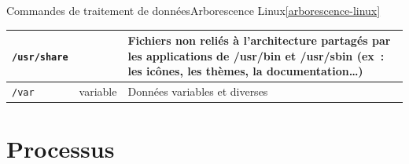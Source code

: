 \documentclass{beamer}
\begin{document}
\begin{frame}{Commandes de traitement de données}{Arborescence Linux\cref{arborescence-linux}}
\begin{tiny}
\begin{table}[h!]
\begin{tabular}{|l|p{3cm}|p{6cm}|}
                    \hline
                    \lstinline{/usr/share} &                         & Fichiers non reliés à l'architecture partagés par les applications de /usr/bin et /usr/sbin (ex~: les icônes, les thèmes, la documentation…)                                         \\
                    \hline
                    \lstinline{/var}       & variable                & Données variables et diverses                                                                                                                                                        \\
                    \hline
                \end{tabular}
            \end{table}
        \end{tiny}
    \end{frame}


    \section{Processus}\label{sec:processus}
\end{document}

